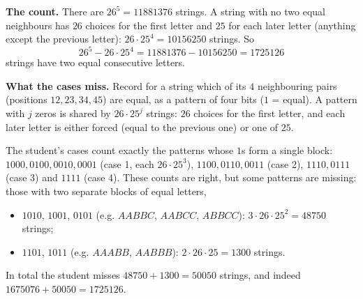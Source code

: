 \textbf{The count.} There are $26^5=11881376$ strings. A string with no two equal neighbours has $26$ choices for the first letter and $25$ for each later letter (anything except the previous letter): $26\cdot25^4=10156250$ strings. So
\[26^5-26\cdot25^4=11881376-10156250=\boxed{1725126}\]
strings have two equal consecutive letters.

\textbf{What the cases miss.} Record for a string which of its $4$ neighbouring pairs (positions $12,23,34,45$) are equal, as a pattern of four bits ($1$ = equal). A pattern with $j$ zeros is shared by $26\cdot25^{j}$ strings: $26$ choices for the first letter, and each later letter is either forced (equal to the previous one) or one of $25$.

The student's cases count exactly the patterns whose $1$s form a single block: $1000,0100,0010,0001$ (case 1, each $26\cdot25^3$), $1100,0110,0011$ (case 2), $1110,0111$ (case 3) and $1111$ (case 4). These counts are right, but some patterns are missing: those with two separate blocks of equal letters,
\begin{itemize}
\item $1010$, $1001$, $0101$ (e.g. $AABBC$, $AABCC$, $ABBCC$): $3\cdot26\cdot25^2=48750$ strings;
\item $1101$, $1011$ (e.g. $AAABB$, $AABBB$): $2\cdot26\cdot25=1300$ strings.
\end{itemize}
In total the student misses $48750+1300=50050$ strings, and indeed $1675076+50050=1725126$.
